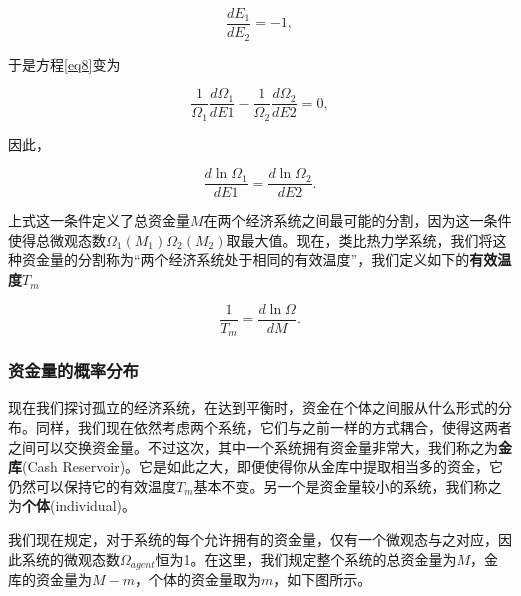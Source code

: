 \documentclass[tsinghuacite]{HustGraduPaper}
\begin{document}
			\begin{equation}
				\frac{d E_1}{d E_2} = -1, \label{eq9}
			\end{equation}
			
			\vspace{1.5em}  
			
			于是方程\eqref{eq8}变为
			
			\begin{equation}
				\frac{1}{\Omega_1} \frac{d \Omega_1}{d E1} - \frac{1}{\Omega_2} \frac{d \Omega_2}{d E2} = 0, \label{eq10}
			\end{equation}
			
			\vspace{1.5em}  
			
			因此，
			
			\begin{equation}
				\frac{d \ln \Omega_1}{d E1} = \frac{d \ln \Omega_2}{d E2}. \label{eq11}
			\end{equation}
			
			\vspace{1.5em}  
			
			上式这一条件定义了总资金量$M$在两个经济系统之间最可能的分割，因为这一条件使得总微观态数$\Omega_1 (M_1) \Omega_2 (M_2)$取最大值。现在，类比热力学系统，我们将这种资金量的分割称为“两个经济系统处于相同的有效温度”，我们定义如下的{\bfseries 有效温度$T_m$}		
			
			\begin{equation}
				\frac{1}{T_m} = \frac{d \ln \Omega}{d M}. \label{eq12}
			\end{equation}
			
			\subsubsection{资金量的概率分布}
			
			现在我们探讨孤立的经济系统，在达到平衡时，资金在个体之间服从什么形式的分布。同样，我们现在依然考虑两个系统，它们与之前一样的方式耦合，使得这两者之间可以交换资金量。不过这次，其中一个系统拥有资金量非常大，我们称之为{\bfseries 金库}(Cash Reservoir)。它是如此之大，即便使得你从金库中提取相当多的资金，它仍然可以保持它的有效温度$T_m$基本不变。另一个是资金量较小的系统，我们称之为{\bfseries 个体}(individual)。
			
			我们现在规定，对于系统的每个允许拥有的资金量，仅有一个微观态与之对应，因此系统的微观态数$\Omega_{agent}$恒为1。在这里，我们规定整个系统的总资金量为$M$，金库的资金量为$M-m$，个体的资金量取为$m$，如下图所示。
			
\end{document}
